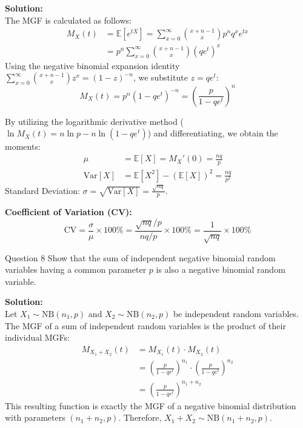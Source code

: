 \documentclass[11pt, a4paper]{article}
\newcommand{\E}{\mathbb{E}}
\newcommand{\Var}{\mathrm{Var}}
\newcommand{\CV}{\mathrm{CV}}
\begin{document}
\noindent\textbf{Solution:} \\
The MGF is calculated as follows:
\begin{align*}
    M_X(t) &= \E[e^{tX}] = \sum_{x=0}^{\infty} \binom{x+n-1}{x} p^n q^x e^{tx} \\
    &= p^n \sum_{x=0}^{\infty} \binom{x+n-1}{x} (qe^t)^x
\end{align*}
Using the negative binomial expansion identity $\sum_{x=0}^{\infty} \binom{x+n-1}{x} z^x = (1-z)^{-n}$, we substitute $z = qe^t$:
\begin{equation}
    M_X(t) = p^n (1 - qe^t)^{-n} = \left( \frac{p}{1 - qe^t} \right)^n
\end{equation}

By utilizing the logarithmic derivative method ($\ln M_X(t) = n \ln p - n \ln(1 - qe^t)$) and differentiating, we obtain the moments:
\begin{align*}
    \mu &= \E[X] = M_X'(0) = \frac{nq}{p} \\
    \Var[X] &= \E[X^2] - (\E[X])^2 = \frac{nq}{p^2}
\end{align*}
Standard Deviation: $\sigma = \sqrt{\Var[X]} = \frac{\sqrt{nq}}{p}$.

\noindent\textbf{Coefficient of Variation (CV):}
\[ \CV = \frac{\sigma}{\mu} \times 100\% = \frac{\sqrt{nq}/p}{nq/p} \times 100\% = \frac{1}{\sqrt{nq}} \times 100\% \]

\clearpage
\begin{problem}{Question 8}
Show that the sum of independent negative binomial random variables having a common parameter $p$ is also a negative binomial random variable.
\end{problem}

\noindent\textbf{Solution:} \\
Let $X_1 \sim \mathrm{NB}(n_1, p)$ and $X_2 \sim \mathrm{NB}(n_2, p)$ be independent random variables. 
The MGF of a sum of independent random variables is the product of their individual MGFs:
\begin{align*}
    M_{X_1 + X_2}(t) &= M_{X_1}(t) \cdot M_{X_2}(t) \\
    &= \left( \frac{p}{1 - qe^t} \right)^{n_1} \cdot \left( \frac{p}{1 - qe^t} \right)^{n_2} \\
    &= \left( \frac{p}{1 - qe^t} \right)^{n_1 + n_2}
\end{align*}
This resulting function is exactly the MGF of a negative binomial distribution with parameters $(n_1 + n_2, p)$. Therefore, $X_1 + X_2 \sim \mathrm{NB}(n_1 + n_2, p)$.
\end{document}
